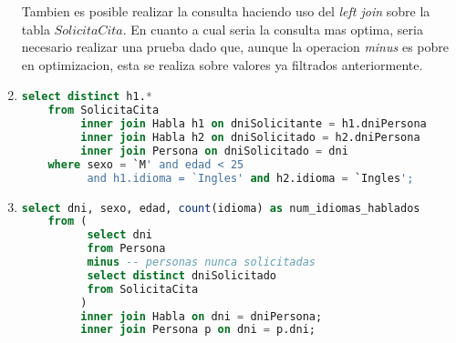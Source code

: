 \begin{enumerate}
	Tambien es posible realizar la consulta haciendo uso del \textit{left join} sobre la tabla $SolicitaCita$.
	En cuanto a cual seria la consulta mas optima, seria necesario realizar una prueba dado que, aunque la operacion \textit{minus} es pobre en optimizacion, esta se realiza sobre valores ya filtrados anteriormente.
	
	\item 
	\begin{lstlisting}[language=sql]
	select distinct h1.*
	from SolicitaCita
		 inner join Habla h1 on dniSolicitante = h1.dniPersona
		 inner join Habla h2 on dniSolicitado = h2.dniPersona
		 inner join Persona on dniSolicitado = dni
	where sexo = `M' and edad < 25 
		  and h1.idioma = `Ingles' and h2.idioma = `Ingles';\end{lstlisting}
	
	\item
	\begin{lstlisting}[language=sql]
	select dni, sexo, edad, count(idioma) as num_idiomas_hablados
	from ( 
		  select dni
		  from Persona
		  minus -- personas nunca solicitadas
		  select distinct dniSolicitado
		  from SolicitaCita
		 )
		 inner join Habla on dni = dniPersona;
		 inner join Persona p on dni = p.dni;\end{lstlisting}
\end{enumerate}
